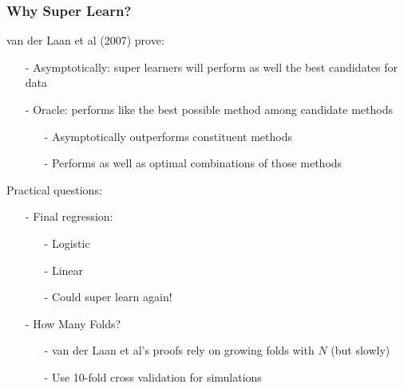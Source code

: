 \documentclass{beamer}
\begin{document}
\begin{frame}




\end{frame}



\begin{frame}
\frametitle{Why Super Learn?}

van der Laan et al (2007) prove:
\begin{itemize}
\item[-] \alert{Asymptotically}: super learners will perform as well the \alert{best} candidates for data 
\item[-] \alert{Oracle}: performs like the best possible method among candidate methods
\begin{itemize}
\item[-] Asymptotically outperforms constituent methods
\item[-] Performs as well as optimal combinations of those methods
\end{itemize}
\end{itemize}

Practical questions:
\begin{itemize}
\item[-] Final regression: 
\begin{itemize}
\item[-] Logistic
\item[-] Linear 
\item[-] \alert{Could super learn again!}
\end{itemize}
\item[-] How Many Folds?
\begin{itemize}
\item[-] van der Laan et al's proofs rely on growing folds with $N$ (but slowly)
\item[-] Use 10-fold cross validation for simulations
\end{itemize}
\end{itemize}


\end{frame}
\end{document}
